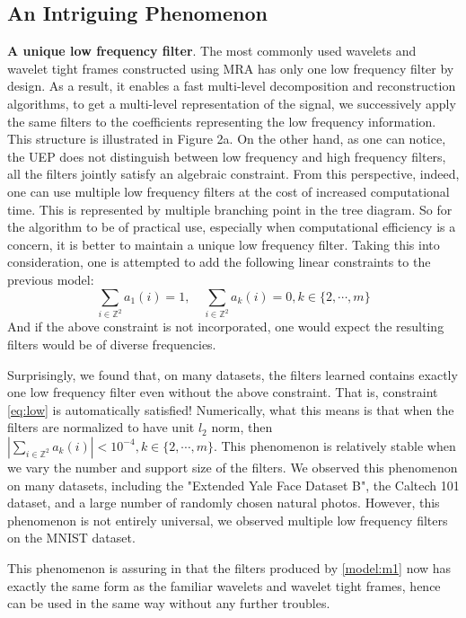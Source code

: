\documentclass[a4paper]{article}
\begin{document}
\subsection{An Intriguing Phenomenon}
\textbf{A unique low frequency filter}. The most commonly used wavelets and wavelet tight frames constructed using MRA has only one low frequency filter by design. As a result, it enables a fast multi-level decomposition and reconstruction algorithms, to get a multi-level representation of the signal, we successively apply the same filters to the coefficients representing the low frequency information. This structure is illustrated in Figure 2a. On the other hand, as one can notice, the UEP does not distinguish between low frequency and high frequency filters, all the filters jointly satisfy an algebraic constraint. From this perspective, indeed, one can use multiple low frequency filters at the cost of increased computational time. This is represented by multiple branching point in the tree diagram. So for the algorithm to be of practical use, especially when computational efficiency is a concern, it is better to maintain a unique low frequency filter. Taking this into consideration, one is attempted to add the following linear constraints to the previous model:
\begin{equation}
\label{eq:low}
\sum_{i\in\mathbb{Z}^2} a_1(i)=1,\quad \sum_{i\in \mathbb{Z}^2} a_k(i)=0, k\in\{2,\cdots,m\}
\end{equation}
And if the above constraint is not incorporated, one would expect the resulting filters would be of diverse frequencies.

Surprisingly, we found that, on many datasets, the filters learned contains exactly one low frequency filter even without the above constraint. That is, constraint \eqref{eq:low} is automatically satisfied!  Numerically, what this means is that when the filters are normalized to have unit $l_2$ norm, then $ |\sum_{i\in \mathbb{Z}^2} a_k(i)| < 10^{-4}, k\in\{2,\cdots,m\}$. This phenomenon is relatively stable when we vary the number and support size of the filters. We observed this phenomenon on many datasets, including the "Extended Yale Face Dataset B"\cite{GeBeKr01}, the Caltech 101 dataset\cite{fei2007learning}, and a large number of randomly chosen natural photos. However, this phenomenon is not entirely universal, we observed multiple low frequency filters on the MNIST dataset\cite{lecun1998gradient}. 

This phenomenon is assuring in that the filters produced by \eqref{model:m1} now has exactly the same form as the familiar wavelets and wavelet tight frames, hence can be used in the same way without any further troubles. 
\end{document}
